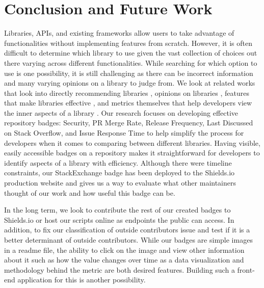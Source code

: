 \documentclass[12pt, letterpaper]{article}
\begin{document}
\section{Conclusion and Future Work}
Libraries, APIs, and existing frameworks allow users to take advantage of functionalities without implementing
features from scratch. However, it is often difficult to determine which library to use given the vast
collection of choices out there varying across different functionalities. 
While searching for which option to use is one possibility, it is still challenging as there can
be incorrect information and many varying opinions on a library to judge from.
We look at related works that look into directly recommending libraries \cite{analogical},
opinions on libraries \cite{opiner}, features that make libraries effective \cite{githubbadges, librarytrends, transparency}
, and metrics themselves that help developers view the inner aspects of a library 
\cite{githubbadges, librarytrends, empiricalmetrics, metrics, transparency, shopifyarticle, apiwave}.
Our research focuses on developing effective repository badges: Security, PR Merge Rate, Release Frequency, Last Discussed on Stack Overflow, and
Issue Response Time to help simplify the process for developers when it comes to comparing between different libraries. 
Having visible, easily accessible badges on a repository makes it straightforward for developers to identify 
aspects of a library with efficiency.
Although there were timeline constraints, our StackExchange badge has been deployed to the Shields.io production website \cite{shields}
and gives us a way to evaluate what other maintainers thought of our work and how useful this badge can be.


In the long term, we look to contribute the rest of our created badges to Shields.io or host our scripts online
as endpoints the public can access. In addition, to fix our classification of outside contributors issue and 
test if it is a better determinant of outside contributors. 
While our badges are simple images in a readme file, the ability to click on the image and view other information
about it such as how the value changes over time as a data visualization
and methodology behind the metric are both desired features. 
Building such a front-end application for this is another possibility. 

\newpage


\end{document}
